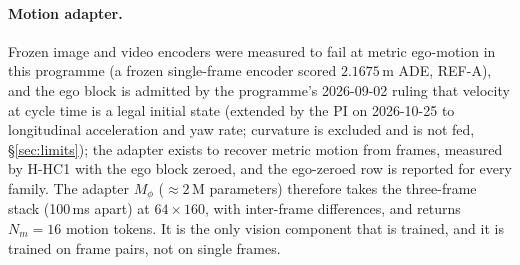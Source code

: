 \paragraph{Motion adapter.}
Frozen image and video encoders were measured to fail at metric ego-motion in this programme (a frozen single-frame encoder scored $2.1675$\,m ADE, REF-A\evI), and the ego block is admitted by the programme's 2026-09-02 ruling that velocity at cycle time is a legal initial state (extended by the PI on 2026-10-25 to longitudinal acceleration and yaw rate; curvature is excluded and is not fed, \S\ref{sec:limits}); the adapter exists to recover metric motion from frames, measured by H-HC1 with the ego block zeroed, and the ego-zeroed row is reported for every family. The adapter $M_\phi$ ($\approx 2$\,M parameters)
therefore takes the three-frame stack (100\,ms apart) at $64\times160$, with inter-frame differences, and returns $N_m=16$ motion tokens. It is the only vision component
that is trained, and it is trained on frame pairs, not on single frames.

